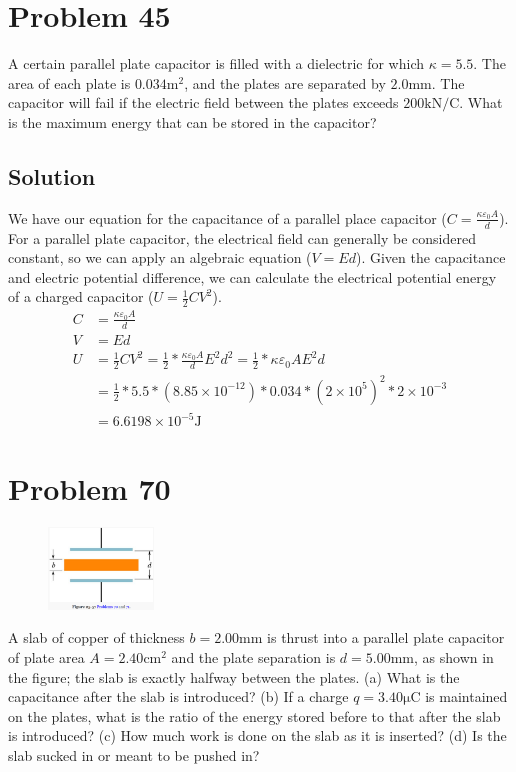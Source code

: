 \documentclass[12pt]{article}
\begin{document}
\section*{Problem 45}
A certain parallel plate capacitor is filled with a dielectric for which $\kappa = 5.5$. 
The area of each plate is $0.034 \unit{\meter^2}$, and the plates are separated by $2.0 \unit{\milli\meter}$. 
The capacitor will fail if the electric field between the plates exceeds $200\unit{\kilo\newton/\coulomb}$. 
What is the maximum energy that can be stored in the capacitor?

\subsection*{Solution}
We have our equation for the capacitance of a parallel place capacitor ($C = \frac{\kappa\varepsilon_0A}{d}$).
For a parallel plate capacitor, the electrical field can generally be considered constant, so we can apply an algebraic equation ($V = Ed$).
Given the capacitance and electric potential difference, we can calculate the electrical potential energy of a charged capacitor ($U = \frac{1}{2}CV^2$).
\begin{align*}
    C   &=  \frac{\kappa\varepsilon_0A}{d}\\
    V   &=  Ed\\
    U   &=  \frac{1}{2}CV^2
        =   \frac{1}{2}*\frac{\kappa\varepsilon_0 A}{d} E^2 d^2
        =   \frac{1}{2}*\kappa\varepsilon_0 A E^2 d\\
        &=  \frac{1}{2} * 5.5 * (8.85 \times 10^{-12}) * 0.034 * \left(2 \times 10^5\right)^2 * 2 \times 10^{-3}\\
        &=  \boxed{6.6198 \times 10^{-5} \unit{\joule}}
\end{align*}

\pagebreak
\section*{Problem 70}
\begin{figure}
    \vspace{-30pt}
    \includegraphics[width=0.25\textwidth]{image.png} 
\end{figure}
A slab of copper of thickness $b = 2.00\unit{\milli\meter}$ is thrust into a parallel plate capacitor of plate area $A = 2.40 \unit{\centi\meter^2}$ and the plate separation is $d = 5.00 \unit{\milli\meter}$, as shown in the figure; the slab is exactly halfway between the plates. 
(a) What is the capacitance after the slab is introduced? 
(b) If a charge $q = 3.40\unit{\micro\coulomb}$ is maintained on the plates, what is the ratio of the energy stored before to that after the slab is introduced? 
(c) How much work is done on the slab as it is inserted? 
(d) Is the slab sucked in or meant to be pushed in?
\end{document}
